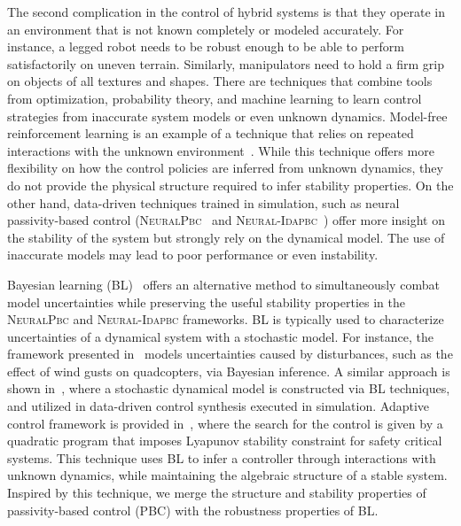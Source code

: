 The second complication in the control of hybrid systems is that they operate in
an environment that is not known completely or modeled accurately.
%
For instance, a legged robot needs to be robust enough to be able to perform
satisfactorily on uneven terrain. Similarly, manipulators need to hold a firm
grip on objects of all textures and shapes.
%
There are techniques that combine tools from optimization, probability theory,
and machine learning to learn control strategies from inaccurate system models
or even unknown dynamics.
%
Model-free reinforcement learning is an example of a technique that relies on
repeated interactions with the unknown
environment~\cite{heess2017emergence,andrychowicz2020learning,lillicrap2015continuous}.
%
While this technique offers more flexibility on how the control policies are
inferred from unknown dynamics, they do not provide the physical structure
required to infer stability properties.
%
On the other hand, data-driven techniques trained in simulation, such as neural
passivity-based control (\textsc{NeuralPbc}~\cite{ashenafi2022robust} and
\textsc{Neural-Idapbc}~\cite{sirichotiyakul2022data}) offer more insight on the
stability of the system but strongly rely on the dynamical model.
%
The use of inaccurate models may lead to poor performance or even instability.
%

Bayesian learning (BL)~\cite{gal2016improving,thakur} offers an alternative
method to simultaneously combat model uncertainties while preserving the useful
stability properties in the \textsc{NeuralPbc} and \textsc{Neural-Idapbc} frameworks.
%
BL is typically used to characterize uncertainties of a dynamical system with a
stochastic model.
%
For instance, the framework presented in~\cite{sadigh2015safe} models
uncertainties caused by disturbances, such as the effect of wind gusts on
quadcopters, via Bayesian inference.
%
A similar approach is shown in~\cite{shen2022online, pmlr-v54-linderman17a}, where
a stochastic dynamical model is constructed via BL techniques, and utilized in
data-driven control synthesis executed in simulation. 
%
%
%
Adaptive control framework is provided in~\cite{fan2020bayesian}, where the
search for the control is given by a quadratic program that imposes
Lyapunov stability constraint for safety critical systems.
%
This technique uses BL to infer a controller through interactions with
unknown dynamics, while maintaining the algebraic structure of a stable system.
%
Inspired by this technique, we merge the structure and stability properties of
passivity-based control (PBC) with the robustness properties of BL.  


